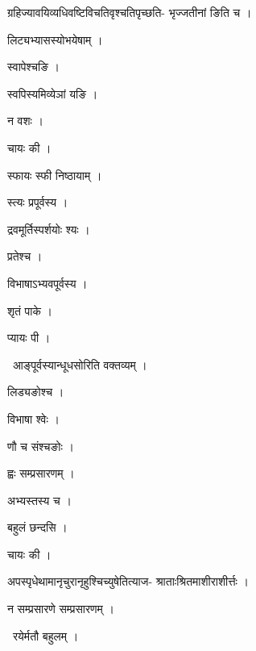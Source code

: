 \documentclass[10pt, openany, oneside]{book}
\begin{document}
\noindent ग्रहिज्यावयिव्यधिवष्टिविचतिवृश्चतिपृच्छति- भृज्जतीनां ङिति च ।

\noindent लिट्यभ्यासस्योभयेषाम् ।

\noindent स्वापेश्चङि ।

\noindent स्वपिस्यमिव्येञां यङि ।

\noindent न वशः ।

\noindent चायः की ।

\noindent स्फायः स्फी निष्ठायाम् ।

\noindent स्त्यः प्रपूर्वस्य ।

\noindent द्रवमूर्तिस्पर्शयोः श्यः ।

\noindent प्रतेश्च ।

\noindent विभाषाऽभ्यवपूर्वस्य ।

\noindent श‍ृतं पाके ।

\noindent प्यायः पी ।

\par\noindent\hspace{1.5em}{\vps वा॰}~{\qt आङ्पूर्वस्यान्धूधसोरिति वक्तव्यम् ।}

\noindent लिड्यङोश्च ।

\noindent विभाषा श्वेः ।

\noindent णौ च संश्चङोः ।

\noindent ह्वः सम्प्रसारणम् ।

\noindent अभ्यस्तस्य च ।

\noindent बहुलं छन्दसि ।

\noindent चायः की ।

\noindent अपस्पृधेथामानृचुरानृहुश्चिच्युषेतित्याज- श्राताःश्रितमाशीराशीर्त्तः ।

\noindent न सम्प्रसारणे सम्प्रसारणम् ।

\par\noindent\hspace{1.5em}{\vps वा॰}~{\qt रयेर्मतौ बहुलम् ।}
\end{document}
